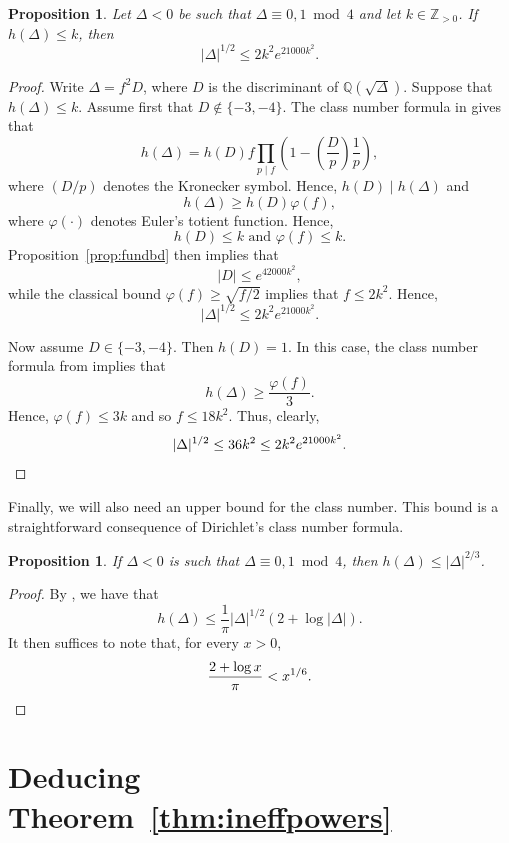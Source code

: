 \documentclass[11pt,a4paper, british]{amsart}
\newtheorem{prop}[thm]{Proposition}
\theoremstyle{definition}
\theoremstyle{remark}
\numberwithin{equation}{section}
\newcommand{\Q}{\mathbb{Q}} %
\newcommand{\Z}{\mathbb{Z}} %
\begin{document}
\begin{prop}\label{prop:class}
	Let $\Delta < 0$ be such that $\Delta \equiv 0, 1 \bmod 4$ and let $k \in \Z_{> 0}$. If $h(\Delta) \leq k$, then 
	\[  \lvert \Delta \rvert^{1/2}  \leq 2k^2 e^{21000k^2}.\]
\end{prop}

\begin{proof}
	Write $\Delta = f^2 D$, where $D$ is the discriminant of $\Q(\sqrt{\Delta})$. Suppose that $h(\Delta) \leq k$.
	Assume first that $D \notin \{-3, -4\}$. The class number formula in \cite[Theorem~7.24]{Cox22} gives that
	\[ h(\Delta) = h(D) f \prod_{p \mid f} \left(1 - \left(\frac{D}{p}\right)\frac{1}{p}\right),\]
	where $(D/p)$ denotes the Kronecker symbol. Hence, $h(D) \mid h(\Delta)$ and
	\[ h(\Delta) \geq h(D) \varphi(f),\]
	where $\varphi(\cdot)$ denotes Euler's totient function. Hence,
	\[h(D) \leq k \mbox{ and } \varphi(f) \leq k.\]
	Proposition~\ref{prop:fundbd} then implies that
	\[ \lvert D \rvert \leq e^{42000k^2}, \]
	while the classical bound $\varphi(f) \geq \sqrt{f/2}$ implies that $f \leq 2k^2$. Hence,
	\[ \lvert \Delta \rvert^{1/2} \leq 2k^2 e^{21000k^2}.\]
	
	Now assume $D \in \{-3, -4\}$. Then $h(D) = 1$. In this case, the class number formula from \cite[Theorem~7.24]{Cox22} implies that
	\[ h(\Delta) \geq  \frac{\varphi(f)}{3}.\]
	Hence, $\varphi(f) \leq 3 k$ and so $f \leq 18 k^2$. Thus, clearly,
	\[ \lvert \Delta \rvert^{1/2} \leq 36k^2 \leq 2 k^2 e^{21000k^2}. \qedhere\]
\end{proof}

Finally, we will also need an upper bound for the class number. This bound is a straightforward consequence of Dirichlet's class number formula.



\begin{prop}\label{prop:upperclass}
	If $\Delta < 0$ is such that $\Delta \equiv 0, 1 \bmod 4$, then $h(\Delta) \leq \lvert \Delta \rvert^{2/3}$.
\end{prop}

\begin{proof}
	By \cite[Proposition~2.2]{Paulin16}, we have that
	\[ h(\Delta) \leq \frac{1}{\pi} \lvert \Delta \rvert^{1/2} (2 + \log \lvert \Delta \rvert).\]
	It then suffices to note that, 	for every $x>0$,
	\[ \frac{2 + \log x}{\pi} < x^{1/6}. \qedhere\]
\end{proof}

\section{Deducing Theorem~\ref{thm:ineffpowers}}\label{sec:ineff}
\end{document}
